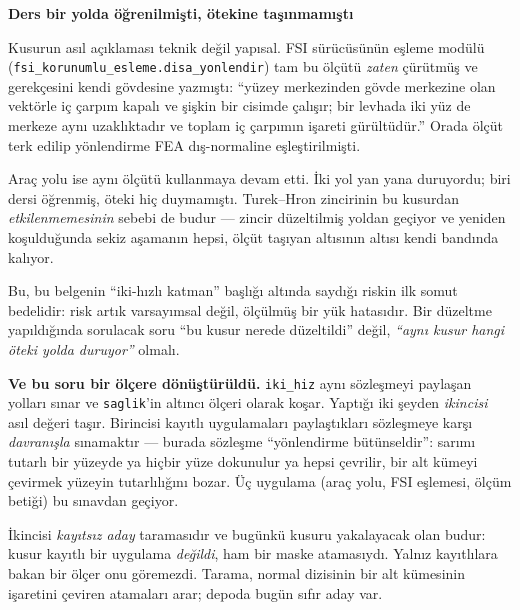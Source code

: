 \documentclass[11pt,a4paper]{article}
\newcommand{\kkkenar}{lacivert}
\newcommand{\kkzemin}{kod}
\newenvironment{renkkutu}[3]{%
  \renewcommand{\kkkenar}{#1}\renewcommand{\kkzemin}{#2}%
  \par\medskip\noindent
  \begin{lrbox}{\kutugovde}%
  \begin{minipage}{\dimexpr\linewidth-2\fboxsep-2\fboxrule\relax}\footnotesize
  \textcolor{#1}{\textbf{#3}}\par\vspace{3pt}%
}{%
  \end{minipage}%
  \end{lrbox}%
  \noindent\fcolorbox{\kkkenar}{\kkzemin}{\usebox{\kutugovde}}%
  \par\medskip
}
\newenvironment{dikkat}[1]{\begin{renkkutu}{orta}{ortabg}{#1}}{\end{renkkutu}}
\begin{document}
\begin{dikkat}{Ders bir yolda öğrenilmişti, ötekine taşınmamıştı}
Kusurun asıl açıklaması teknik değil yapısal. FSI sürücüsünün eşleme
modülü (\texttt{fsi\_korunumlu\_esleme.disa\_yonlendir}) tam bu ölçütü
\emph{zaten} çürütmüş ve gerekçesini kendi gövdesine yazmıştı: ``yüzey
merkezinden gövde merkezine olan vektörle iç çarpım kapalı ve şişkin bir
cisimde çalışır; bir levhada iki yüz de merkeze aynı uzaklıktadır ve
toplam iç çarpımın işareti gürültüdür.'' Orada ölçüt terk edilip yönlendirme
FEA dış-normaline eşleştirilmişti.

\noindent Araç yolu ise aynı ölçütü kullanmaya devam etti. İki yol yan
yana duruyordu; biri dersi öğrenmiş, öteki hiç duymamıştı. Turek--Hron
zincirinin bu kusurdan \emph{etkilenmemesinin} sebebi de budur --- zincir
düzeltilmiş yoldan geçiyor ve yeniden koşulduğunda sekiz aşamanın hepsi,
ölçüt taşıyan altısının altısı kendi bandında kalıyor.

\noindent Bu, bu belgenin ``iki-hızlı katman'' başlığı altında saydığı
riskin ilk somut bedelidir: risk artık varsayımsal değil, ölçülmüş bir
yük hatasıdır. Bir düzeltme yapıldığında sorulacak soru ``bu kusur nerede
düzeltildi'' değil, \emph{``aynı kusur hangi öteki yolda duruyor''}
olmalı.
\end{dikkat}

\noindent \textbf{Ve bu soru bir ölçere dönüştürüldü.} \texttt{iki\_hiz}
aynı sözleşmeyi paylaşan yolları sınar ve \texttt{saglik}'in altıncı
ölçeri olarak koşar. Yaptığı iki şeyden \emph{ikincisi} asıl değeri
taşır. Birincisi kayıtlı uygulamaları paylaştıkları sözleşmeye karşı
\emph{davranışla} sınamaktır --- burada sözleşme ``yönlendirme
bütünseldir'': sarımı tutarlı bir yüzeyde ya hiçbir yüze dokunulur ya
hepsi çevrilir, bir alt kümeyi çevirmek yüzeyin tutarlılığını bozar. Üç
uygulama (araç yolu, FSI eşlemesi, ölçüm betiği) bu sınavdan geçiyor.

\noindent İkincisi \emph{kayıtsız aday} taramasıdır ve bugünkü kusuru
yakalayacak olan budur: kusur kayıtlı bir uygulama \emph{değildi}, ham
bir maske atamasıydı. Yalnız kayıtlılara bakan bir ölçer onu göremezdi.
Tarama, normal dizisinin bir alt kümesinin işaretini çeviren atamaları
arar; depoda bugün sıfır aday var.
\end{document}
